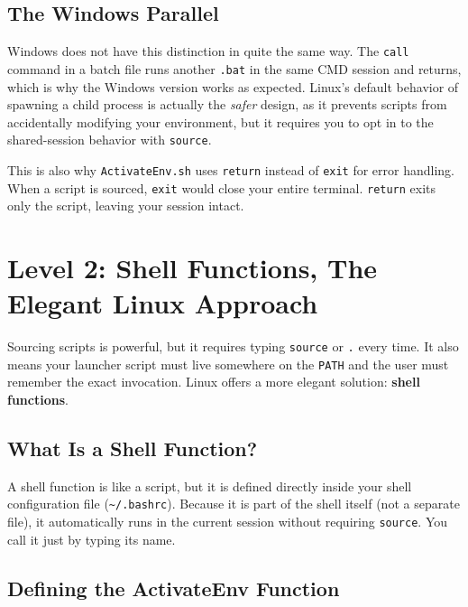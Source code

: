 \subsection{The Windows Parallel}

Windows does not have this distinction in quite the same way. The
\texttt{call} command in a batch file runs another \texttt{.bat} in the
same CMD session and returns, which is why the Windows version works
as expected. Linux's default behavior of spawning a child process is
actually the \emph{safer} design, as it prevents scripts from accidentally
modifying your environment, but it requires you to opt in to the
shared-session behavior with \texttt{source}.

\begin{notebox}
This is also why \texttt{ActivateEnv.sh} uses \texttt{return} instead of
\texttt{exit} for error handling. When a script is sourced, \texttt{exit}
would close your entire terminal. \texttt{return} exits only the script,
leaving your session intact.
\end{notebox}

\section{Level 2: Shell Functions, The Elegant Linux Approach}
\label{sec:level2}

Sourcing scripts is powerful, but it requires typing \texttt{source}
or \texttt{.} every time. It also means your launcher script must live
somewhere on the \texttt{PATH} and the user must remember the exact
invocation. Linux offers a more elegant solution: \textbf{shell functions}.

\subsection{What Is a Shell Function?}

A shell function is like a script, but it is defined directly inside
your shell configuration file (\texttt{\textasciitilde/.bashrc}).
Because it is part of the shell itself (not a separate file), it
automatically runs in the current session without requiring
\texttt{source}. You call it just by typing its name.

\subsection{Defining the ActivateEnv Function}

